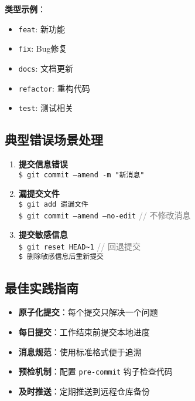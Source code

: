 \textbf{类型示例}：
\begin{itemize}[leftmargin=*, nosep]
    \item \texttt{feat}: 新功能
    \item \texttt{fix}: Bug修复
    \item \texttt{docs}: 文档更新
    \item \texttt{refactor}: 重构代码
    \item \texttt{test}: 测试相关
\end{itemize}

\subsection{典型错误场景处理}
\begin{enumerate}[leftmargin=*, nosep]
    \item \textbf{提交信息错误} \\
    \texttt{\$ git commit --amend -m "新消息"}
    
    \item \textbf{漏提交文件} \\
    \texttt{\$ git add 遗漏文件} \\
    \texttt{\$ git commit --amend --no-edit} \quad \textcolor{gray}{// 不修改消息}
    
    \item \textbf{提交敏感信息} \\
    \texttt{\$ git reset HEAD\~{}1} \quad \textcolor{gray}{// 回退提交} \\
    \texttt{\$ 删除敏感信息后重新提交}
\end{enumerate}

\subsection{最佳实践指南}
\begin{itemize}[leftmargin=*, nosep]
    \item {\color{red}\textbf{原子化提交}}：每个提交只解决一个问题
    \item {\color{red}\textbf{每日提交}}：工作结束前提交本地进度
    \item \textbf{消息规范}：使用标准格式便于追溯
    \item \textbf{预检机制}：配置 \texttt{pre-commit} 钩子检查代码
    \item \textbf{及时推送}：定期推送到远程仓库备份
\end{itemize}


